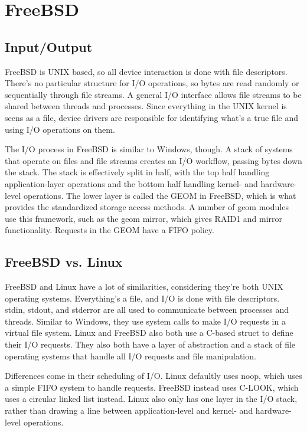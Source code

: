 \documentclass[draftclsnofoot,onecolumn,journal,letterpaper,10pt]{IEEEtran}
\begin{document}
\section{FreeBSD}

\subsection{Input/Output}

FreeBSD is UNIX based, so all device interaction is done with file descriptors. There's no particular structure for I/O operations, so bytes are read randomly or sequentially through file streams. A general I/O interface allows file streams to be shared between threads and processes. Since everything in the UNIX kernel is seens as a file, device drivers are responsible for identifying what's a true file and using I/O operations on them.\cite{bsdio}

The I/O process in FreeBSD is similar to Windows, though. A stack of systems that operate on files and file streams creates an I/O workflow, passing bytes down the stack. The stack is effectively split in half, with the top half handling application-layer operations and the bottom half handling kernel- and hardware-level operations. The lower layer is called the GEOM in FreeBSD, which is what provides the standardized storage access methods. A number of geom modules use this framework, such as the geom mirror, which gives RAID1 and mirror functionality. Requests in the GEOM have a FIFO policy.\cite{bsdnetflix}

\subsection{FreeBSD vs. Linux}

FreeBSD and Linux have a lot of similarities, considering they're both UNIX operating systems. Everything's a file, and I/O is done with file descriptors. stdin, stdout, and stderror are all used to communicate between processes and threads. Similar to Windows, they use system calls to make I/O requests in a virtual file system. Linux and FreeBSD also both use a C-based struct to define their I/O requests. They also both have a layer of abstraction and a stack of file operating systems that handle all I/O requests and file manipulation. 

Differences come in their scheduling of I/O. Linux defaultly uses noop, which uses a simple FIFO system to handle requests. FreeBSD instead uses C-LOOK, which uses a circular linked list instead. Linux also only has one layer in the I/O stack, rather than drawing a line between application-level and kernel- and hardware-level operations.\cite{bsdmanual}
\end{document}
